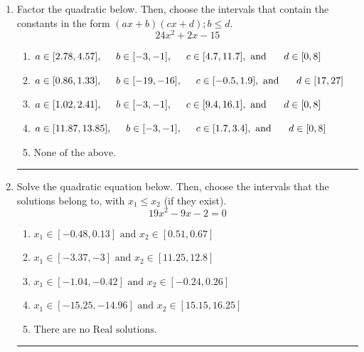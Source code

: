 \documentclass[14pt]{extbook}
\newcommand{\litem}[1]{\item#1\hspace*{-1cm}\rule{\textwidth}{0.4pt}}
\begin{document}
\begin{enumerate}
{\begin{enumerate}[label=\Alph*.]
\end{enumerate} }
\litem{
Factor the quadratic below. Then, choose the intervals that contain the constants in the form $(ax+b)(cx+d); b \leq d.$\[ 24x^{2} +2 x -15 \]\begin{enumerate}[label=\Alph*.]
\item \( a \in [2.78, 4.57], \hspace*{5mm} b \in [-3, -1], \hspace*{5mm} c \in [4.7, 11.7], \text{ and } \hspace*{5mm} d \in [0, 8] \)
\item \( a \in [0.86, 1.33], \hspace*{5mm} b \in [-19, -16], \hspace*{5mm} c \in [-0.5, 1.9], \text{ and } \hspace*{5mm} d \in [17, 27] \)
\item \( a \in [1.02, 2.41], \hspace*{5mm} b \in [-3, -1], \hspace*{5mm} c \in [9.4, 16.1], \text{ and } \hspace*{5mm} d \in [0, 8] \)
\item \( a \in [11.87, 13.85], \hspace*{5mm} b \in [-3, -1], \hspace*{5mm} c \in [1.7, 3.4], \text{ and } \hspace*{5mm} d \in [0, 8] \)
\item \( \text{None of the above.} \)

\end{enumerate} }
\litem{
Solve the quadratic equation below. Then, choose the intervals that the solutions belong to, with $x_1 \leq x_2$ (if they exist).\[ 19x^{2} -9 x -2 = 0 \]\begin{enumerate}[label=\Alph*.]
\item \( x_1 \in [-0.48, 0.13] \text{ and } x_2 \in [0.51, 0.67] \)
\item \( x_1 \in [-3.37, -3] \text{ and } x_2 \in [11.25, 12.8] \)
\item \( x_1 \in [-1.04, -0.42] \text{ and } x_2 \in [-0.24, 0.26] \)
\item \( x_1 \in [-15.25, -14.96] \text{ and } x_2 \in [15.15, 16.25] \)
\item \( \text{There are no Real solutions.} \)


\end{enumerate}}
\end{enumerate}
\end{document}
